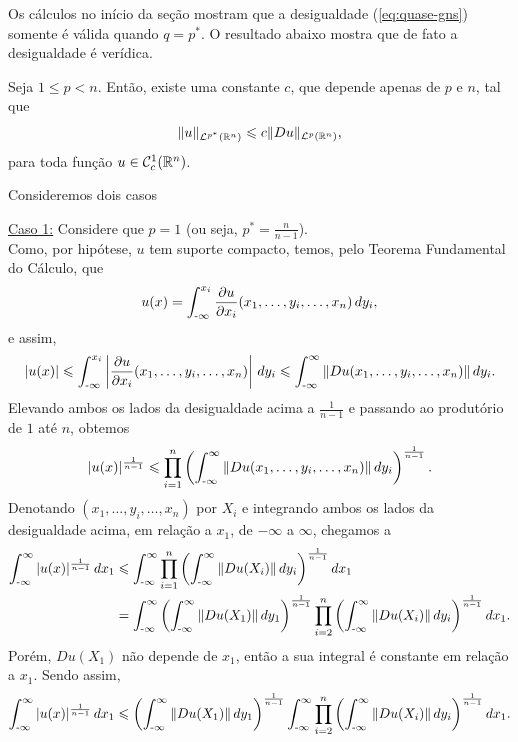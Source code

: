 Os cálculos no início da seção mostram que a desigualdade (\ref{eq:quase-gns}) somente é válida quando $q = p^*$. O resultado abaixo mostra que de fato a desigualdade é verídica.

\begin{tbox} Seja $1 \leqslant p < n$. Então, existe uma constante $c$, que depende apenas de $p$ e $n$, tal que
\begin{equation} \label{eq:gns}
    \Vert u \Vert_{\mathcal{L}^{p^*}(\mathbb{R}^n)} \leqslant c \Vert Du \Vert_{\mathcal{L}^p(\mathbb{R}^n)},
\end{equation}
para toda função $u \in \mathcal{C}^1_c(\mathbb{R}^n)$.
\end{tbox}
\begin{prf}
    Consideremos dois casos

    \underline{Caso 1:} Considere que $p = 1$ (ou seja, $p^* = \frac{n}{n-1}$).\\
    Como, por hipótese, $u$ tem suporte compacto, temos, pelo Teorema Fundamental do Cálculo, que
    \[
        u(x) = \int_{\text{-}\infty}^{x_i} \dfrac{\partial u}{\partial x_i}(x_1,\dots,y_i,\dots,x_n) \, dy_i,
    \]
    e assim,
    \[
        |u(x)| \leqslant \int_{\text{-}\infty}^{x_i} \left|\dfrac{\partial u}{\partial x_i}(x_1,\dots,y_i,\dots,x_n)\right| \, dy_i  \leqslant \int_{\text{-}\infty}^{\infty} \Vert Du(x_1,\dots,y_i,\dots,x_n) \Vert \,dy_i.
    \]
    Elevando ambos os lados da desigualdade acima a $\frac{1}{n-1}$ e passando ao produtório de $1$ até $n$, obtemos
    \[
        |u(x)|^{\frac{1}{n-1}} \leqslant \prod_{i=1}^n \left( \int_{\text{-}\infty}^{\infty} \Vert Du(x_1,\dots,y_i,\dots,x_n) \Vert \,dy_i \right)^{\frac{1}{n-1}}.
    \]
    Denotando $(x_1,\dots,y_i,\dots,x_n)$ por $X_i$ e integrando ambos os lados da desigualdade acima, em relação a $x_1$, de $-\infty$ a $\infty$, chegamos a
    \[
        \begin{aligned}
            \int_{\text{-}\infty}^{\infty} |u(x)|^{\frac{1}{n-1}} \,dx_1 &\leqslant \int_{\text{-}\infty}^{\infty} \prod_{i=1}^n \left( \int_{\text{-}\infty}^{\infty} \Vert Du(X_i) \Vert \,dy_i \right)^{\frac{1}{n-1}}  dx_1\\ 
            &= \int_{\text{-}\infty}^{\infty} \left( \int_{\text{-}\infty}^{\infty} \Vert Du(X_1    ) \Vert \,dy_1 \right)^{\frac{1}{n-1}}  \prod_{i=2}^n \left(\int_{\text{-}\infty}^{\infty} \Vert Du(X_i) \Vert \, dy_i\right)^{\frac{1}{n-1}} dx_1.
        \end{aligned}
    \]
    Porém, $Du(X_1)$ não depende de $x_1$, então a sua integral é constante em relação a $x_1$. Sendo assim,
    \[
        \int_{\text{-}\infty}^{\infty} |u(x)|^{\frac{1}{n-1}} \,dx_1 \leqslant \left( \int_{\text{-}\infty}^{\infty} \Vert Du(X_1)\Vert \,dy_1 \right)^{\frac{1}{n-1}}\int_{\text{-}\infty}^{\infty}   \prod_{i=2}^n \left(\int_{\text{-}\infty}^{\infty} \Vert Du(X_i) \Vert \, dy_i\right)^{\frac{1}{n-1}} dx_1.
\]
\end{prf}
